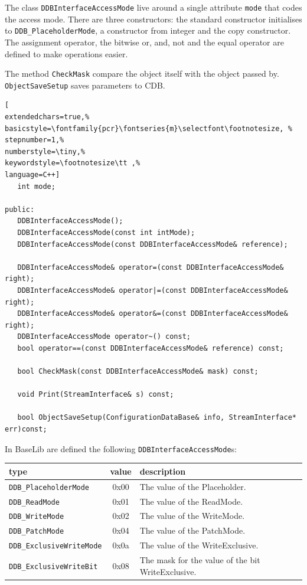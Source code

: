The class \texttt{DDBInterfaceAccessMode} live around a single attribute \texttt{mode} that codes the access mode. There are three constructors: the standard constructor initialises to \texttt{DDB\_PlaceholderMode}, a constructor from integer and the copy constructor.
The assignment operator, the bitwise or, and, not and the equal operator are defined to make operations easier.

The method \texttt{CheckMask} compare the object itself with the object passed by.
\texttt{ObjectSaveSetup} saves parameters to CDB.
\begin{lstlisting}[
extendedchars=true,%
basicstyle=\fontfamily{pcr}\fontseries{m}\selectfont\footnotesize, %
stepnumber=1,%
numberstyle=\tiny,%
keywordstyle=\footnotesize\tt ,%
language=C++]
   int mode;

public:
   DDBInterfaceAccessMode();
   DDBInterfaceAccessMode(const int intMode);
   DDBInterfaceAccessMode(const DDBInterfaceAccessMode& reference);

   DDBInterfaceAccessMode& operator=(const DDBInterfaceAccessMode& right);
   DDBInterfaceAccessMode& operator|=(const DDBInterfaceAccessMode& right);
   DDBInterfaceAccessMode& operator&=(const DDBInterfaceAccessMode& right);
   DDBInterfaceAccessMode operator~() const;
   bool operator==(const DDBInterfaceAccessMode& reference) const;

   bool CheckMask(const DDBInterfaceAccessMode& mask) const;

   void Print(StreamInterface& s) const;

   bool ObjectSaveSetup(ConfigurationDataBase& info, StreamInterface* err)const;
\end{lstlisting}

In BaseLib are defined the following \texttt{DDBInterfaceAccessMode}s:

\begin{table}[!h]
 \begin{center}
  \begin{tabular}{|l|c|l|}
   \hline
type & value & description \\
   \hline
\texttt{DDB\_PlaceholderMode} & 0x00 & The value of the Placeholder. \\
\texttt{DDB\_ReadMode} & 0x01 & The value of the ReadMode. \\
\texttt{DDB\_WriteMode} & 0x02 & The value of the WriteMode. \\
\texttt{DDB\_PatchMode} & 0x04 & The value of the PatchMode. \\
\texttt{DDB\_ExclusiveWriteMode} & 0x0a & The value of the WriteExclusive. \\
\texttt{DDB\_ExclusiveWriteBit} & 0x08 & The mask for the value of the bit WriteExclusive. \\
   \hline
  \end{tabular}
 \end{center}
\end{table}



